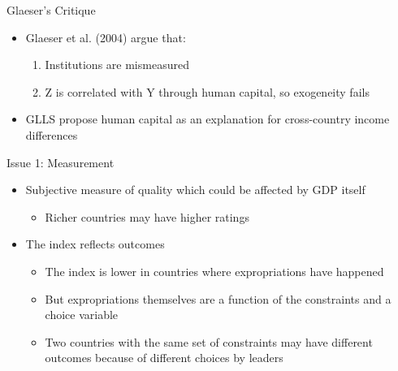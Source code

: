 \documentclass[11pt,notes=hide,aspectratio=169,mathserif]{beamer}
\begin{document}
\begin{frame}{Glaeser's Critique}
\begin{itemize}
\item Glaeser et al. (2004) argue that:
\begin{enumerate}
    \item Institutions are mismeasured
    \item Z is correlated with Y through human capital, so exogeneity fails
\end{enumerate}
\item GLLS propose human capital as an explanation for cross-country income differences
\end{itemize}
\end{frame}

    
\begin{frame}{Issue 1: Measurement}
\begin{itemize}
\item Subjective measure of quality which could be affected by GDP itself
\begin{itemize}
    \item Richer countries may have higher ratings 
\end{itemize}
\item The index reflects outcomes
\begin{itemize}
    \item The index is lower in countries where expropriations have happened
    \item But expropriations themselves are a function of the constraints and a choice variable
    \item Two countries with the same set of constraints may have different outcomes because of different choices by leaders
\end{itemize}
\end{itemize}
\end{frame}
\end{document}
